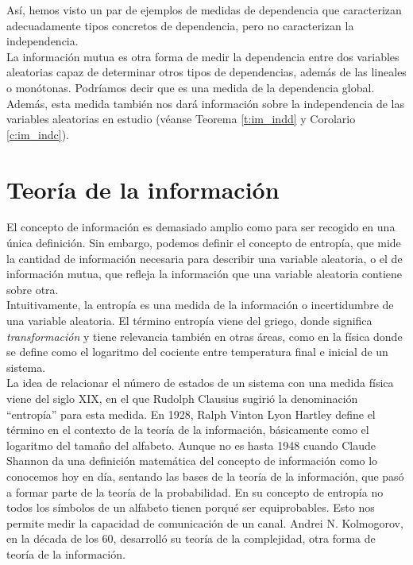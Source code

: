 \documentclass[12pt,a4paper]{report} %
\theoremstyle{definition}
\begin{document}
Así, hemos visto un par de ejemplos de medidas de dependencia que caracterizan adecuadamente tipos concretos de dependencia, pero no caracterizan la independencia.\\

La información mutua es otra forma de medir la dependencia entre dos variables aleatorias capaz de determinar otros tipos de dependencias, además de las lineales o monótonas. Podríamos decir que es una medida de la dependencia global. Además, esta medida también nos dará información sobre la independencia de las variables aleatorias en estudio (véanse Teorema \ref{t:im_indd} y Corolario \ref{c:im_indc}).\\

    \section{Teoría de la información}

    El concepto de información es demasiado amplio como para ser recogido en una única definición. Sin embargo, podemos definir el concepto de entropía, que mide la cantidad de información necesaria para describir una variable aleatoria, o el de información mutua, que refleja la información que una variable aleatoria contiene sobre otra.\\

    Intuitivamente, la entropía es una medida de la información o incertidumbre de una variable aleatoria. El término entropía viene del griego, donde significa \textit{transformación} y tiene relevancia también en otras áreas, como en la física donde se define como el logaritmo del cociente entre temperatura final e inicial de un sistema.\\

    La idea de relacionar el número de estados de un sistema con una medida física viene del siglo XIX, en el que Rudolph Clausius sugirió la denominación ``entropía'' para esta medida. En 1928, Ralph Vinton Lyon Hartley define el término en el contexto de la teoría de la información, básicamente como el logaritmo del tamaño del alfabeto. Aunque no es hasta 1948 cuando Claude Shannon da una definición matemática del concepto de información como lo conocemos hoy en día,  sentando las bases de la teoría de la información, que pasó a formar parte de la teoría de la probabilidad. En su concepto de entropía no todos los símbolos de un alfabeto tienen porqué ser equiprobables. Esto nos permite medir la capacidad de comunicación de un canal. Andrei N. Kolmogorov, en la década de los 60, desarrolló su teoría de la complejidad, otra forma de teoría de la información.\\
\end{document}
